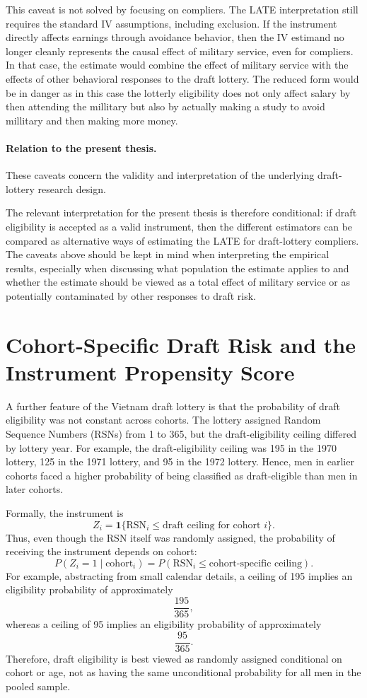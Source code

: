 \documentclass[11pt,a4paper]{article}
\begin{document}
This caveat is not solved by focusing on compliers. The LATE interpretation still requires
the standard IV assumptions, including exclusion. If the instrument directly affects earnings
through avoidance behavior, then the IV estimand no longer cleanly represents the causal
effect of military service, even for compliers. In that case, the estimate would combine the
effect of military service with the effects of other behavioral responses to the draft lottery.
The reduced form would be in danger as in this case the lotterly eligibility does not only affect salary by then attending the millitary but also by actually making a study to avoid millitary and then making more money. 

\paragraph{Relation to the present thesis.}
These caveats concern the validity and interpretation of the underlying draft-lottery research
design.

The relevant interpretation for the present thesis is therefore conditional: if draft eligibility
is accepted as a valid instrument, then the different estimators can be compared as alternative
ways of estimating the LATE for draft-lottery compliers. The caveats above should be kept
in mind when interpreting the empirical results, especially when discussing what population
the estimate applies to and whether the estimate should be viewed as a total effect of
military service or as potentially contaminated by other responses to draft risk.



\section{Cohort-Specific Draft Risk and the Instrument Propensity Score}

A further feature of the Vietnam draft lottery is that the probability of draft eligibility
was not constant across cohorts. The lottery assigned Random Sequence Numbers (RSNs)
from 1 to 365, but the draft-eligibility ceiling differed by lottery year. For example,
the draft-eligibility ceiling was 195 in the 1970 lottery, 125 in the 1971 lottery, and
95 in the 1972 lottery. Hence, men in earlier cohorts faced a higher probability of being
classified as draft-eligible than men in later cohorts.

Formally, the instrument is
\[
    Z_i =
    \mathbf{1}\{\text{RSN}_i \leq \text{draft ceiling for cohort } i\}.
\]
Thus, even though the RSN itself was randomly assigned, the probability of receiving
the instrument depends on cohort:
\[
    P(Z_i=1 \mid \text{cohort}_i)
    =
    P(\text{RSN}_i \leq \text{cohort-specific ceiling}).
\]
For example, abstracting from small calendar details, a ceiling of 195 implies an
eligibility probability of approximately
\[
    \frac{195}{365},
\]
whereas a ceiling of 95 implies an eligibility probability of approximately
\[
    \frac{95}{365}.
\]
Therefore, draft eligibility is best viewed as randomly assigned conditional on cohort
or age, not as having the same unconditional probability for all men in the pooled sample.
\end{document}
